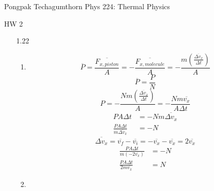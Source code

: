 \documentclass{article}
\begin{document}
\large
{\Large Pongpak Techagumthorn
\hfill Phys 224: Thermal Physics}
\begin{center}
    {\Large
        HW 2
    }
    \end{center}
\vspace{0.1in}
\begin{enumerate}
    \item [1.22]
    \begin{enumerate}
        \item
            \begin{equation*}
                \overline{P} = \frac{\overline{F_{x,piston}}}{A} = - \frac{\overline{F_{x,molecule}}}{A} = - \frac{m \left( \frac{\overline{\Delta v_x}}{\Delta t} \right)}{A}
            \end{equation*}
            \begin{equation*}
                \overline{P} = \frac{P}{N}
            \end{equation*}
            \begin{equation*}
                P = - \frac{Nm \left( \frac{\overline{\Delta v_x}}{\Delta t} \right)}{A} = - \frac{Nm \overline{v_x}}{A \Delta t}
            \end{equation*}
            \begin{align*}
                PA \Delta t &= -Nm \overline{\Delta v_x} \\
                \frac{PA \Delta t}{m \overline{\Delta v_x}} &= -N
            \end{align*}
            \begin{equation*}
                \overline{\Delta v_x} = \overline{v_f} - \overline{v_i} = - \overline{v_x} - \overline{v_x} = 2 \overline{v_x}
            \end{equation*}
            \begin{align*}
                \frac{PA \Delta t}{m \left(-2 \overline{v_x} \right)} &= -N \\
                \frac{PA \Delta t}{2m \overline{v_x}} &= N
            \end{align*}
        \vspace{0.05in}
        \item
            \begin{align*}

\end{align*}
\end{enumerate}
\end{enumerate}
\end{document}
